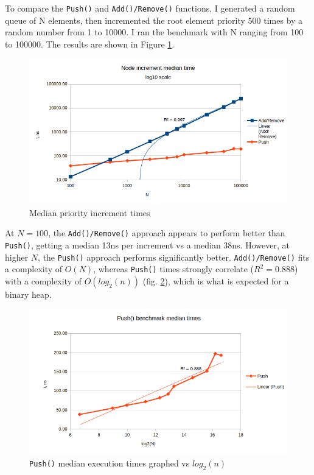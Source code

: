 \documentclass[a4paper,11pt]{article}
\begin{document}
    To compare the \texttt{Push()} and \texttt{Add()/Remove()} functions, I generated a random queue of N elements, then incremented the root element priority 500 times by a random number from 1 to 10000. I ran the benchmark with N ranging from 100 to 100000. The results are shown in Figure \ref{fig:push}.

    \begin{figure}[H]
        \centering
        \includegraphics[width=\textwidth]{push.png}
        \caption{Median priority increment times}
        \label{fig:push}
    \end{figure}

    At $N=100$, the \texttt{Add()/Remove()} approach appears to perform better than \texttt{Push()}, getting a median 13ns per increment vs a median 38ns. However, at higher $N$, the \texttt{Push()} approach performs significantly better. \texttt{Add()/Remove()} fits a complexity of $O(N)$, whereas \texttt{Push()} times strongly correlate ($R^2=0.888$) with a complexity of $O(log_2({n}))$ (fig. \ref{fig:push-complexity}), which is what is expected for a binary heap.

    \begin{figure}[H]
        \centering
        \includegraphics[width=\textwidth]{complexity-push.png}
        \caption{\texttt{Push()} median execution times graphed vs $log_2{(n)}$}
        \label{fig:push-complexity}
    \end{figure}
\end{document}

